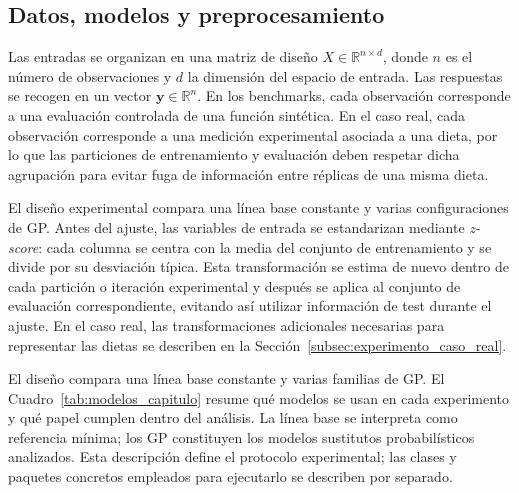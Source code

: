\subsection{Datos, modelos y preprocesamiento}\label{subsubsec:representacion_datos}

Las entradas se organizan en una matriz de diseño \(X \in \mathbb{R}^{n \times d}\), donde \(n\) es el número de observaciones y \(d\) la dimensión del espacio de entrada. Las respuestas se recogen en un vector \(\bm{y} \in \mathbb{R}^{n}\). En los benchmarks, cada observación corresponde a una evaluación controlada de una función sintética. En el caso real, cada observación corresponde a una medición experimental asociada a una dieta, por lo que las particiones de entrenamiento y evaluación deben respetar dicha agrupación para evitar fuga de información entre réplicas de una misma dieta.

El diseño experimental compara una línea base constante y varias configuraciones de GP. Antes del ajuste, las variables de entrada se estandarizan mediante \emph{z-score}: cada columna se centra con la media del conjunto de entrenamiento y se divide por su desviación típica. Esta transformación se estima de nuevo dentro de cada partición o iteración experimental y después se aplica al conjunto de evaluación correspondiente, evitando así utilizar información de test durante el ajuste. En el caso real, las transformaciones adicionales necesarias para representar las dietas se describen en la Sección~\ref{subsec:experimento_caso_real}.

El diseño compara una línea base constante y varias familias de GP. El Cuadro~\ref{tab:modelos_capitulo} resume qué modelos se usan en cada experimento y qué papel cumplen dentro del análisis. La línea base se interpreta como referencia mínima; los GP constituyen los modelos sustitutos probabilísticos analizados. Esta descripción define el protocolo experimental; las clases y paquetes concretos empleados para ejecutarlo se describen por separado.

